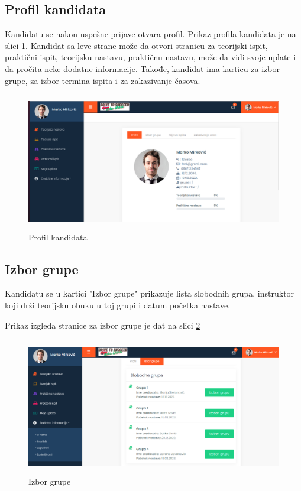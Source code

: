 \subsection{Profil kandidata}

Kandidatu se nakon uspešne prijave otvara profil. Prikaz profila kandidata je na slici \ref{fig:profil}. 
Kandidat sa leve strane može da otvori stranicu za teorijski ispit, praktični ispit, teorijsku nastavu, praktičnu nastavu, 
može da vidi svoje uplate i da pročita neke dodatne informacije. Takođe, kandidat ima karticu za izbor grupe, za izbor termina ispita i za zakazivanje časova.

\begin{figure}[H]
  \begin{center}
      \includegraphics[width=140mm, height=60mm]{UI/UI_profil_kandidata.png}
  \end{center}
  \caption {Profil kandidata}
  \label{fig:profil}

\end{figure}

\subsection{Izbor grupe}

Kandidatu se u kartici "Izbor grupe" prikazuje lista slobodnih grupa, instruktor koji drži teorijsku obuku u toj grupi i datum početka nastave. 


Prikaz izgleda stranice za izbor grupe je dat na slici \ref{fig:ui_izbor_grupe}

\begin{figure}[H]
  \begin{center}
      \includegraphics[width=140mm, height=60mm]{UI/UI_izbor_grupe.png}
  \end{center}
  \caption {Izbor grupe}
  \label{fig:ui_izbor_grupe}

\end{figure}

